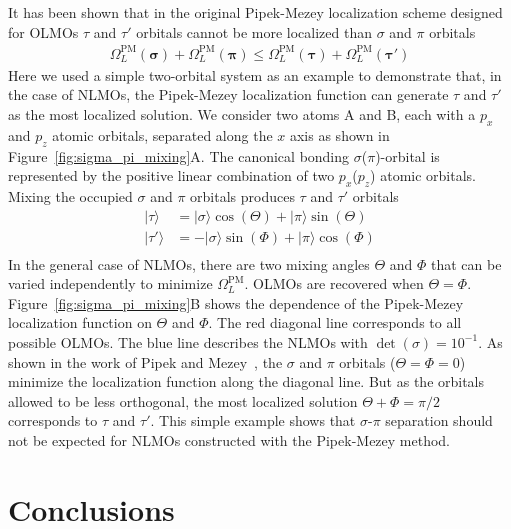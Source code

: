 \documentclass[aps,prl,reprint,amsmath,amssymb]{revtex4-1}
\newcommand{\ket}[1]{\ensuremath{\vert #1 \rangle}}
\begin{document}
It has been shown that in the original Pipek-Mezey localization scheme designed for OLMOs $\tau$ and $\tau'$ orbitals cannot be more localized than $\sigma$ and $\pi$ orbitals~\cite{pipek1989fast}
%
\begin{equation} \label{eq:OLMO-pipek}
\begin{split}
\Omega_L^{\text{PM}}(\mathbf{\sigma}) + \Omega_L^{\text{PM}}(\mathbf{\pi}) \leqslant \Omega_L^{\text{PM}}(\mathbf{\tau}) + \Omega_L^{\text{PM}}(\mathbf{\tau'})
\end{split}
\end{equation}
%
Here we used a simple two-orbital system as an example to demonstrate that, in the case of NLMOs, the Pipek-Mezey localization function can generate $\tau$ and $\tau'$ as the most localized solution. 
We consider two atoms A and B, each with a $p_x$ and $p_z$ atomic orbitals, separated along the $x$ axis as shown in Figure~\ref{fig:sigma_pi_mixing}A.
The canonical bonding $\sigma$($\pi$)-orbital is represented by the positive linear combination of two $p_x$($p_z$) atomic orbitals. 
Mixing the occupied $\sigma$ and $\pi$ orbitals produces $\tau$ and $\tau'$ orbitals
%
\begin{equation} \label{eq:tao-pipek}
\begin{split}
\ket{\tau} &= \ket{\sigma}\cos(\Theta) + \ket{\pi} \sin(\Theta)\\
\ket{\tau'} &= - \ket{\sigma} \sin(\Phi) + \ket{\pi} \cos(\Phi) \\
\end{split}
\end{equation}
%
In the general case of NLMOs, there are two mixing angles $\Theta$ and $\Phi$ that can be varied independently to minimize $\Omega^{\text{PM}}_L$. OLMOs are recovered when $\Theta = \Phi$. 
Figure~\ref{fig:sigma_pi_mixing}B shows the dependence of the Pipek-Mezey localization function on $\Theta$ and $\Phi$. 
The red diagonal line corresponds to all possible OLMOs. The blue line describes the NLMOs with $\det(\sigma) = 10^{-1}$. 
As shown in the work of Pipek and Mezey~\cite{pipek1989fast}, the $\sigma$ and $\pi$ orbitals ($\Theta=\Phi=0$) minimize the localization function along the diagonal line. 
But as the orbitals allowed to be less orthogonal, the most localized solution $\Theta+\Phi=\pi/2$ corresponds to $\tau$ and $\tau'$. 
This simple example shows that $\sigma$-$\pi$ separation should not be expected for NLMOs constructed with the Pipek-Mezey method.

\section{Conclusions}
\end{document}
